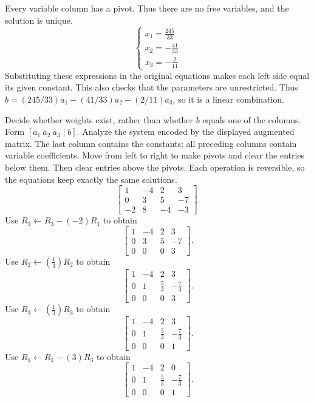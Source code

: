 Every variable column has a pivot. Thus there are no free variables, and the solution is unique.
\[ \begin{cases}x_{1}=\frac{245}{33}\\x_{2}=- \frac{41}{33}\\x_{3}=- \frac{2}{11}\end{cases}\]
Substituting these expressions in the original equations makes each left side equal its given constant. This also checks that the parameters are unrestricted.
Thus $b=(245/33)a_1-(41/33)a_2-(2/11)a_3$, so it is a linear combination.

\goal Decide whether weights exist, rather than whether $b$ equals one of the columns. Form $[a_1\ a_2\ a_3\mid b]$.
\goal Analyze the system encoded by the displayed augmented matrix. The last column contains the constants; all preceding columns contain variable coefficients.
\idea Move from left to right to make pivots and clear the entries below them. Then clear entries above the pivots. Each operation is reversible, so the equations keep exactly the same solutions.
\[ \left[\begin{array}{rrr|r}1&-4&2&3\\0&3&5&-7\\-2&8&-4&-3\end{array}\right].\]
Use $R_{3}\leftarrow R_{3}-(-2)R_{1}$ to obtain
\[ \left[\begin{array}{rrr|r}1&-4&2&3\\0&3&5&-7\\0&0&0&3\end{array}\right].\]
Use $R_{2}\leftarrow(\frac{1}{3})R_{2}$ to obtain
\[ \left[\begin{array}{rrr|r}1&-4&2&3\\0&1&\frac{5}{3}&- \frac{7}{3}\\0&0&0&3\end{array}\right].\]
Use $R_{3}\leftarrow(\frac{1}{3})R_{3}$ to obtain
\[ \left[\begin{array}{rrr|r}1&-4&2&3\\0&1&\frac{5}{3}&- \frac{7}{3}\\0&0&0&1\end{array}\right].\]
Use $R_{1}\leftarrow R_{1}-(3)R_{3}$ to obtain
\[ \left[\begin{array}{rrr|r}1&-4&2&0\\0&1&\frac{5}{3}&- \frac{7}{3}\\0&0&0&1\end{array}\right].\]
